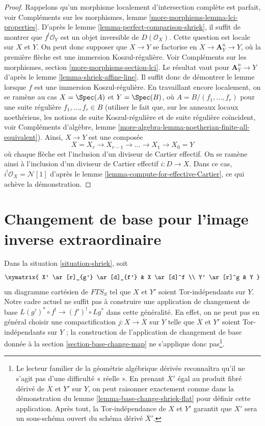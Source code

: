 \begin{proof}
Rappelons qu'un morphisme localement d'intersection complète est parfait, voir Compléments sur les morphismes, lemme \ref{more-morphisms-lemma-lci-properties}. D'après le lemme \ref{lemma-perfect-comparison-shriek}, il suffit de montrer que $f^!\mathcal{O}_Y$ est un objet inversible de $D(\mathcal{O}_X)$. Cette question est locale sur $X$ et $Y$. On peut donc supposer que $X \to Y$ se factorise en $X \to \mathbf{A}^n_Y \to Y$, où la première flèche est une immersion Koszul-régulière. Voir Compléments sur les morphismes, section \ref{more-morphisms-section-lci}. Le résultat vaut pour $\mathbf{A}^n_Y \to Y$ d'après le lemme \ref{lemma-shriek-affine-line}. Il suffit donc de démontrer le lemme lorsque $f$ est une immersion Koszul-régulière. En travaillant encore localement, on se ramène au cas $X = \Spec(A)$ et $Y = \Spec(B)$, où $A = B/(f_1, \ldots, f_r)$ pour une suite régulière $f_1, \ldots, f_r \in B$ (utiliser le fait que, sur les anneaux locaux noethériens, les notions de suite Koszul-régulière et de suite régulière coïncident, voir Compléments d'algèbre, lemme \ref{more-algebra-lemma-noetherian-finite-all-equivalent}). Ainsi, $X \to Y$ est une composée
$$
X = X_r \to X_{r - 1} \to \ldots \to X_1 \to X_0 = Y
$$
où chaque flèche est l'inclusion d'un diviseur de Cartier effectif. On se ramène ainsi à l'inclusion d'un diviseur de Cartier effectif $i : D \to X$. Dans ce cas, $i^!\mathcal{O}_X = \mathcal{N}[1]$ d'après le lemme \ref{lemma-compute-for-effective-Cartier}, ce qui achève la démonstration.
\end{proof}







\section{Changement de base pour l'image inverse extraordinaire}
\label{section-base-change-shriek}

\noindent
Dans la situation \ref{situation-shriek}, soit
$$
\xymatrix{
X' \ar[r]_{g'} \ar[d]_{f'} & X \ar[d]^f \\
Y' \ar[r]^g & Y
}
$$
un diagramme cartésien de $\textit{FTS}_S$ tel que $X$ et $Y'$ soient Tor-indépendants sur $Y$. Notre cadre actuel ne suffit pas à construire une application de changement de base $L(g')^* \circ f^! \to (f')^! \circ Lg^*$ dans cette généralité. En effet, on ne peut pas en général choisir une compactification $j : X \to \overline{X}$ sur $Y$ telle que $\overline{X}$ et $Y'$ soient Tor-indépendants sur $Y$ ; la construction de l'application de changement de base donnée à la section \ref{section-base-change-map} ne s'applique donc pas\footnote{Le lecteur familier de la géométrie algébrique dérivée reconnaîtra qu'il ne s'agit pas d'une difficulté « réelle ». En prenant $\overline{X}'$ égal au produit fibré dérivé de $\overline{X}$ et $Y'$ sur $Y$, on peut raisonner exactement comme dans la démonstration du lemme \ref{lemma-base-change-shriek-flat} pour définir cette application. Après tout, la Tor-indépendance de $X$ et $Y'$ garantit que $X'$ sera un sous-schéma ouvert du schéma dérivé $\overline{X}'$.}.


